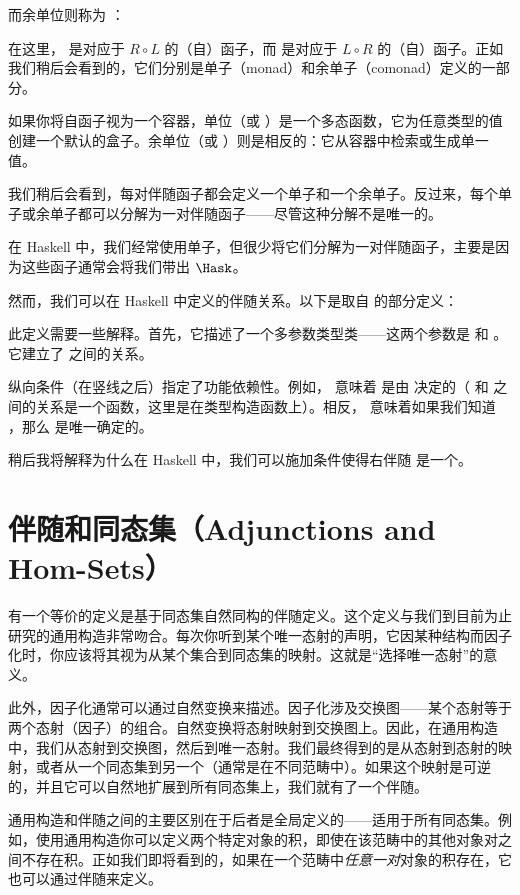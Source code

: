 而余单位则称为 ：

在这里， 是对应于 $R \circ L$ 的（自）函子，而  是对应于 $L \circ R$ 的（自）函子。正如我们稍后会看到的，它们分别是单子（monad）和余单子（comonad）定义的一部分。

如果你将自函子视为一个容器，单位（或 ）是一个多态函数，它为任意类型的值创建一个默认的盒子。余单位（或 ）则是相反的：它从容器中检索或生成单一值。

我们稍后会看到，每对伴随函子都会定义一个单子和一个余单子。反过来，每个单子或余单子都可以分解为一对伴随函子——尽管这种分解不是唯一的。

在 Haskell 中，我们经常使用单子，但很少将它们分解为一对伴随函子，主要是因为这些函子通常会将我们带出 $\Hask$。

然而，我们可以在 Haskell 中定义的伴随关系。以下是取自  的部分定义：

此定义需要一些解释。首先，它描述了一个多参数类型类——这两个参数是  和 。它建立了  之间的关系。

纵向条件（在竖线之后）指定了功能依赖性。例如， 意味着  是由  决定的（ 和  之间的关系是一个函数，这里是在类型构造函数上）。相反， 意味着如果我们知道 ，那么  是唯一确定的。

稍后我将解释为什么在 Haskell 中，我们可以施加条件使得右伴随  是一个。

\section{伴随和同态集（Adjunctions and Hom-Sets）}

有一个等价的定义是基于同态集自然同构的伴随定义。这个定义与我们到目前为止研究的通用构造非常吻合。每次你听到某个唯一态射的声明，它因某种结构而因子化时，你应该将其视为从某个集合到同态集的映射。这就是“选择唯一态射”的意义。

此外，因子化通常可以通过自然变换来描述。因子化涉及交换图——某个态射等于两个态射（因子）的组合。自然变换将态射映射到交换图上。因此，在通用构造中，我们从态射到交换图，然后到唯一态射。我们最终得到的是从态射到态射的映射，或者从一个同态集到另一个（通常是在不同范畴中）。如果这个映射是可逆的，并且它可以自然地扩展到所有同态集上，我们就有了一个伴随。

通用构造和伴随之间的主要区别在于后者是全局定义的——适用于所有同态集。例如，使用通用构造你可以定义两个特定对象的积，即使在该范畴中的其他对象对之间不存在积。正如我们即将看到的，如果在一个范畴中\emph{任意一对}对象的积存在，它也可以通过伴随来定义。

